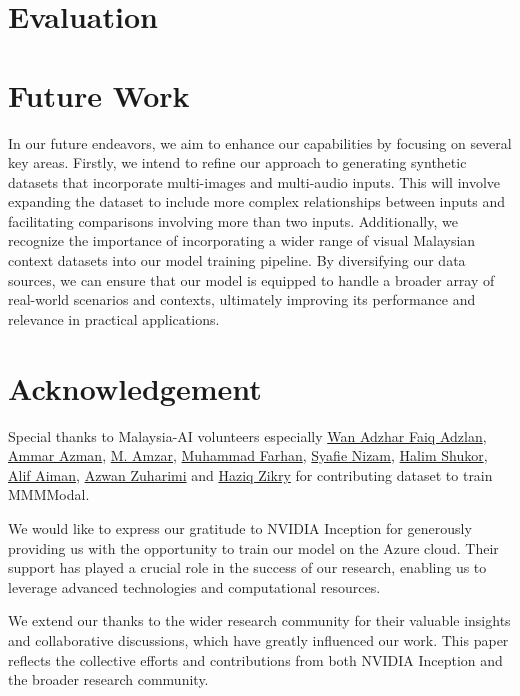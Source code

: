 \documentclass[preprint]{article}
\begin{document}
\newpage

\section{Evaluation}

\section{Future Work}

In our future endeavors, we aim to enhance our capabilities by focusing on several key areas. Firstly, we intend to refine our approach to generating synthetic datasets that incorporate multi-images and multi-audio inputs. This will involve expanding the dataset to include more complex relationships between inputs and facilitating comparisons involving more than two inputs. Additionally, we recognize the importance of incorporating a wider range of visual Malaysian context datasets into our model training pipeline. By diversifying our data sources, we can ensure that our model is equipped to handle a broader array of real-world scenarios and contexts, ultimately improving its performance and relevance in practical applications.

\section{Acknowledgement}

Special thanks to Malaysia-AI volunteers especially \href{https://www.linkedin.com/in/wan-adzhar-faiq-adzlan-19a27baa/}{Wan Adzhar Faiq Adzlan}, \href{https://www.linkedin.com/in/ammar-azman/}{Ammar Azman}, \href{https://www.linkedin.com/in/amzar96/}{M. Amzar}, \href{https://www.linkedin.com/in/muhammad-farhan-helmy-0529501a7/}{Muhammad Farhan}, \href{https://www.linkedin.com/in/syafie-nizam/}{Syafie Nizam}, \href{https://www.linkedin.com/in/halimshukor/}{Halim Shukor}, \href{https://www.linkedin.com/in/alif-aiman-1b334b24b/}{Alif Aiman}, \href{https://www.linkedin.com/in/azwan-zuharimi/}{Azwan Zuharimi} and \href{https://www.linkedin.com/in/haziqzikry/}{Haziq Zikry} for contributing dataset to train MMMModal.

We would like to express our gratitude to NVIDIA Inception for generously providing us with the opportunity to train our model on the Azure cloud. Their support has played a crucial role in the success of our research, enabling us to leverage advanced technologies and computational resources.

We extend our thanks to the wider research community for their valuable insights and collaborative discussions, which have greatly influenced our work. This paper reflects the collective efforts and contributions from both NVIDIA Inception and the broader research community.
\end{document}
